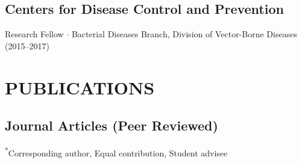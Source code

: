 \documentclass{cv}
\begin{document}
\subsection*{Centers for Disease Control and Prevention}

Research Fellow $\cdot$ Bacterial Diseases Branch, Division of Vector-Borne Diseases (2015--2017)


\section*{PUBLICATIONS}

\subsection*{Journal Articles (Peer Reviewed)}

{\small \textsuperscript{*}Corresponding author, \textsuperscript{\dag}Equal contribution, \textsuperscript{\ddag}Student advisee}
\end{document}
